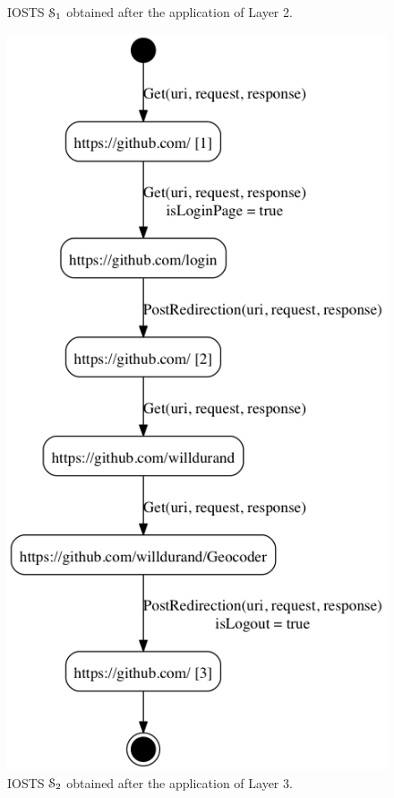 \begin{example}
\begin{figure}[h]
\begin{minipage}{.5\textwidth}
    \caption{IOSTS $\EuScript{S}_1$ obtained after the
    application of Layer 2.}
    \label{fig:github:iosts:1}
\end{minipage}
\begin{minipage}{.5\textwidth}
    \includegraphics[width=1.0\linewidth]{figures/gh-iosts-2.png}

    \caption{IOSTS $\EuScript{S}_2$ obtained after the
    application of Layer 3.}
    \label{fig:github:iosts:2}
\end{minipage}
\end{figure}
\end{example}

